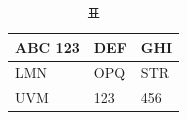 \documentclass[11pt,a4paper]{article}
\begin{document}
\begin{table}[h]
\caption{표}
\begin{tabular}{|l|l|l|}
\hline
ABC 123 & DEF & GHI \\ \hline
LMN & OPQ & STR \\ \hline
UVM & 123 & 456 \\ \hline
\end{tabular}
\end{table}

\begin{table}[h]
\begin{tabular}{|l|l|}
\hline
 &  \\ \hline
\end{tabular}
\end{table}
\end{document}
